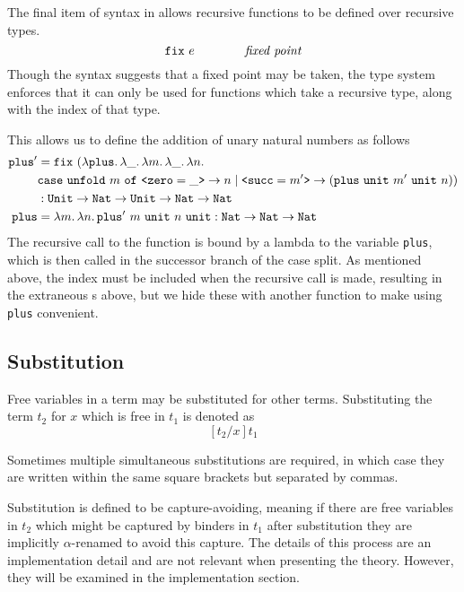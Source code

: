 \documentclass[12pt,a4paper,twoside]{report}
\begin{document}
The final item of syntax in \pimu{} allows recursive functions to be defined over recursive types.
\[
    \mathtt{fix}\ e \qquad\qquad\textit{fixed point}
\]
Though the syntax suggests that a fixed point may be taken, the type system enforces that it can only be used for functions which take a recursive type, along with the index of that type.

This allows us to define the addition of unary natural numbers as follows
\begin{align*}
    \texttt{plus}' &= \fix{(\fun{\texttt{plus}}{\fun{\_}{\fun{m}{\fun{\_}{\fun{n}{\\
        &\texttt{case}\ \unfold{m}\ \texttt{of}\ \texttt{<}\texttt{zero} = \_\texttt{>} \rightarrow n
        \mid \texttt{<}\texttt{succ} = m'\texttt{>} \rightarrow (\app{\app{\app{\app{\texttt{plus}}{\unit{}}}{m'}}{\unit{}}}{n})
    }}}}})}
    \\
    &: \upi{\Unit}{\upi{\texttt{Nat}}{\upi{\Unit}{\upi{\texttt{Nat}}{\texttt{Nat}}}}} \\
    \texttt{plus} &= \annot{\fun{m}{\fun{n}{\app{\texttt{plus}'}{\app{\app{m}{\unit}}{\app{n}{\unit}}}}}}{\upi{\texttt{Nat}}{\upi{\texttt{Nat}}{\texttt{Nat}}}}
\end{align*}
The recursive call to the function is bound by a lambda to the variable \texttt{plus}, which is then called in the successor branch of the case split.
As mentioned above, the index must be included when the recursive call is made, resulting in the extraneous \unit{}s above, but we hide these with another function to make using \texttt{plus} convenient.

\subsection{Substitution}

Free variables in a term may be substituted for other terms.
Substituting the term \(t_2\) for \(x\) which is free in \(t_1\) is denoted as
\[
    [t_2 / x] t_1
\]

Sometimes multiple simultaneous substitutions are required, in which case they are written within the same square brackets but separated by commas.

Substitution is defined to be capture-avoiding, meaning if there are free variables in \(t_2\) which might be captured by binders in \(t_1\) after substitution they are implicitly \(\alpha\)-renamed to avoid this capture.
The details of this process are an implementation detail and are not relevant when presenting the theory.
However, they will be examined in the implementation section.
\end{document}

